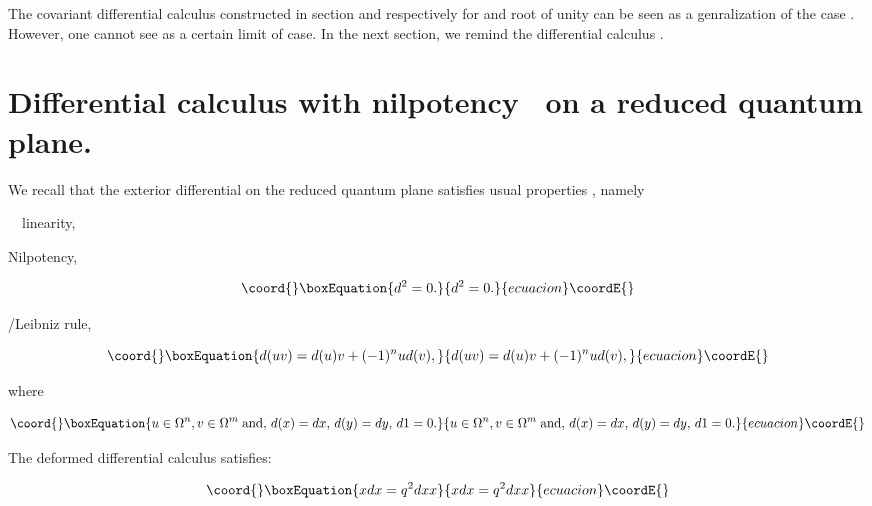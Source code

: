 \documentclass[a4paper,12pt,thmsa]{article}
\begin{document}
The covariant \coordHE{} differential calculus constructed in section \coordHE{} and \coordHE{}
respectively for \coordHE{}  \coordHE{} and \coordHE{}root of unity can be seen as a
genralization of the case \coordHE{}. However, one cannot see \coordHE{} as a
certain limit of \coordHE{} case. In the next section, we remind the
differential calculus \coordHE{}.

\section{Differential calculus with nilpotency \coordHE{} \ on a reduced quantum
plane.}

We recall that the exterior differential \coordHE{} on the reduced quantum plane
satisfies usual properties \myHighlight{$[6-9]$}\coordHE{}, namely

\coordHE{} \ \ linearity,

\coordHE{}  \coordHE{}  \myHighlight{$/$}\coordHE{} Nilpotency,

\begin{equation}\coord{}\boxEquation{
d^2=0.
}{
d^2=0.
}{ecuacion}\coordE{}\end{equation}

\coordHE{}  \coordHE{}  \coordHE{} /Leibniz rule,

\begin{equation}\coord{}\boxEquation{
d(uv)=d(u)v+(-1)^nud(v),
}{
d(uv)=d(u)v+(-1)^nud(v),
}{ecuacion}\coordE{}\end{equation}

where

\begin{equation}\coord{}\boxEquation{
u\in \Omega ^n,v\in \Omega ^m\;\hbox{and},\, d(x)=dx,\, d(y)=dy,
\, d1=0.
}{
u\in \Omega ^n,v\in \Omega ^m\;\hbox{and},\, d(x)=dx,\, d(y)=dy,
\, d1=0.
}{ecuacion}\coordE{}\end{equation}

The deformed differential calculus satisfies:

\begin{equation}\coord{}\boxEquation{
xdx=q^2dxx
}{
xdx=q^2dxx
}{ecuacion}\coordE{}\end{equation}
\end{document}
